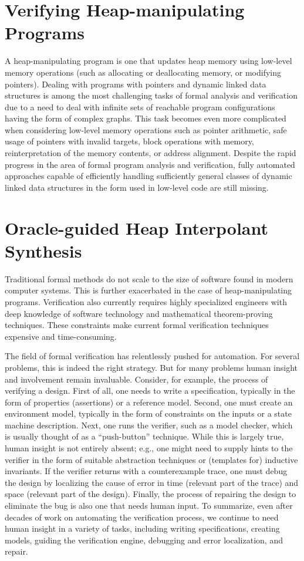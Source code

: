 \section{Verifying Heap-manipulating Programs}
A heap-manipulating program is one that updates heap memory using low-level memory operations (such as allocating or deallocating memory, or modifying pointers). Dealing with programs with pointers and dynamic linked data structures is among the most challenging tasks of formal analysis and verification due to a need to deal with infinite sets of reachable program configurations having the form of complex graphs. This task becomes even more complicated when considering low-level memory operations such as pointer arithmetic, safe usage of pointers with invalid targets, block operations with memory, reinterpretation of the memory contents, or address alignment. Despite the rapid progress in the area of formal program analysis and verification, fully automated approaches capable of efficiently handling sufficiently general classes of dynamic
linked data structures in the form used in low-level code are still missing.

\section{Oracle-guided Heap Interpolant Synthesis}
Traditional formal methods do not scale to the size of software found in modern computer systems. This is further exacerbated in the case of heap-manipulating programs. Verification also currently requires highly specialized engineers with deep knowledge of software technology and mathematical theorem-proving techniques. These constraints make current formal verification techniques expensive and time-consuming.





The field of formal verification has relentlessly pushed for automation. For several problems, this is indeed the right strategy. But for many problems human insight and involvement remain invaluable. Consider, for example, the process of verifying a design. First of all, one needs to write a specification, typically in the form of properties (assertions) or a reference model. Second, one must create an environment model, typically in the form of constraints on the inputs or a state machine description. Next, one runs the verifier, such as a model checker, which is usually thought of as a “push-button” technique. While this is largely true, human insight is not entirely absent; e.g., one might need to supply hints to the verifier in the form of suitable abstraction techniques or (templates for) inductive invariants. If the verifier returns with a counterexample trace, one must debug the design by localizing the cause of error in time (relevant part of the trace) and space (relevant part of the design). Finally, the process of repairing the design to eliminate the bug is also one that needs human input. To summarize, even
after decades of work on automating the verification process, we continue to need human insight in a variety of tasks, including writing specifications, creating models, guiding the verification engine, debugging and error localization, and repair.

